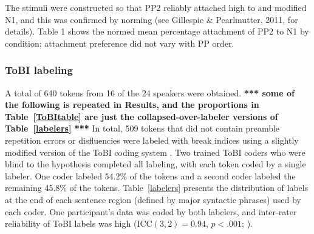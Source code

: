 \documentclass[12pt,titlepage]{article}
\newcommand{\NOTE}[1]{\textbf{*** #1 ***}}  %
\newcommand{\IGNORE}[1]{} %
\begin{document}
The stimuli were constructed so that PP2 reliably attached high to and modified N1, and this was confirmed by norming (see Gillespie \& Pearlmutter, 2011, for details).  Table 1 shows the normed mean percentage attachment of PP2 to N1 by condition; attachment preference did not vary with PP order.

\IGNORE{
For the current purposes, each word position within the preamble was labeled (see Table~\ref{GPstim}). Sentence regions (see Table~\ref{GPstim}) were also identified with NP referring to the head noun phrase (D1$-$N1), PP1 referring to the first prepositional phrase (P1$-$N2), and PP2 referring to the second prepositional phrase (P2$-$N3).}


\subsubsection{ToBI labeling}

A total of 640 tokens from 16 of the 24 speakers\IGNORE{ in
\citeauthor{GillespiePearlmutter11}'s (2011)~Experiment~2} were
obtained.  \NOTE{some of the following is repeated in Results, and the
proportions in Table~\ref{ToBItable} are just the
collapsed-over-labeler versions of Table~\ref{labelers}} In total, 509
tokens that did not contain preamble repetition errors or disfluencies
were labeled with break indices using a slightly modified version of
the ToBI coding system \cite{TOBI}.  Two trained ToBI coders who were
blind to the hypothesis completed all labeling, with each token coded
by a single labeler.  One coder labeled 54.2\% of the tokens and a
second coder labeled the remaining 45.8\% of the tokens.
Table~\ref{labelers} presents the distribution of labels at the end of
each sentence region (defined by major syntactic phrases) used by each
coder.  \IGNORE{ transcribed and labeled by at least one
\IGNORE{trained}coder\IGNORE{ who was blind to the hypothesis for
break indices}, } One participant's data was coded by both labelers,
and inter-rater reliability of ToBI labels was high (ICC$(3,2) =
0.94$, $p <.001$; ).
\end{document}
